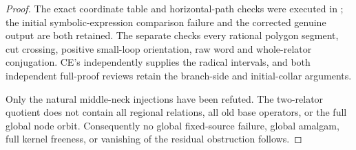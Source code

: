 \begin{proof}
The exact coordinate table and horizontal-path checks were
executed in
;
the initial symbolic-expression comparison failure and the
corrected genuine output are both retained. The separate
 checks every rational
polygon segment, cut crossing, positive small-loop orientation,
raw word and whole-relator conjugation. CE's
 independently supplies
the radical intervals, and both independent full-proof reviews
retain the branch-side and initial-collar arguments.

Only the natural middle-neck injections have been refuted.
The two-relator quotient does not contain all regional relations,
all old base operators, or the full global node orbit. Consequently
no global fixed-source failure, global amalgam, full kernel
freeness, or vanishing of the residual obstruction follows.
\end{proof}
